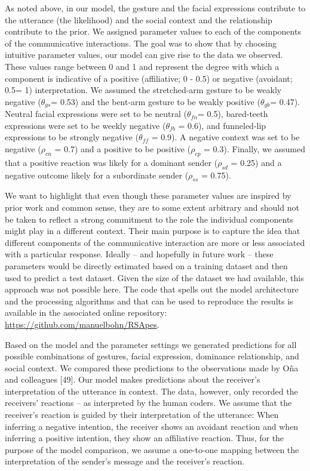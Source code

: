 \documentclass[
  man,floatsintext]{apa6}
\begin{document}
As noted above, in our model, the gesture and the facial expressions contribute to the utterance (the likelihood) and the social context and the relationship contribute to the prior. We assigned parameter values to each of the components of the communicative interactions. The goal was to show that by choosing intuitive parameter values, our model can give rise to the data we observed. These values range between 0 and 1 and represent the degree with which a component is indicative of a positive (affiliative; 0 - 0.5) or negative (avoidant; 0.5= 1) interpretation. We assumed the stretched-arm gesture to be weakly negative (\(\theta_{gs}\)= 0.53) and the bent-arm gesture to be weakly positive (\(\theta_{gb}\)= 0.47). Neutral facial expressions were set to be neutral (\(\theta_{fn}\)= 0.5), bared-teeth expressions were set to be weekly negative (\(\theta_{fb}\) = 0.6), and funneled-lip expressions to be strongly negative (\(\theta_{ff}\) = 0.9). A negative context was set to be negative (\(\rho_{cn}\) = 0.7) and a positive to be positive (\(\rho_{cp}\) = 0.3). Finally, we assumed that a positive reaction was likely for a dominant sender (\(\rho_{sd}\) = 0.25) and a negative outcome likely for a subordinate sender (\(\rho_{ss}\) = 0.75).

We want to highlight that even though these parameter values are inspired by prior work and common sense, they are to some extent arbitrary and should not be taken to reflect a strong commitment to the role the individual components might play in a different context. Their main purpose is to capture the idea that different components of the communicative interaction are more or less associated with a particular response. Ideally -- and hopefully in future work -- these parameters would be directly estimated based on a training dataset and then used to predict a test dataset. Given the size of the dataset we had available, this approach was not possible here. The code that spells out the model architecture and the processing algorithms and that can be used to reproduce the results is available in the associated online repository: \url{https://github.com/manuelbohn/RSApes}.

Based on the model and the parameter settings we generated predictions for all possible combinations of gestures, facial expression, dominance relationship, and social context. We compared these predictions to the observations made by Oña and colleagues {[}49{]}. Our model makes predictions about the receiver's interpretation of the utterance in context. The data, however, only recorded the receivers' reactions -- as interpreted by the human coders. We assume that the receiver's reaction is guided by their interpretation of the utterance: When inferring a negative intention, the receiver shows an avoidant reaction and when inferring a positive intention, they show an affiliative reaction. Thus, for the purpose of the model comparison, we assume a one-to-one mapping between the interpretation of the sender's message and the receiver's reaction.
\end{document}
